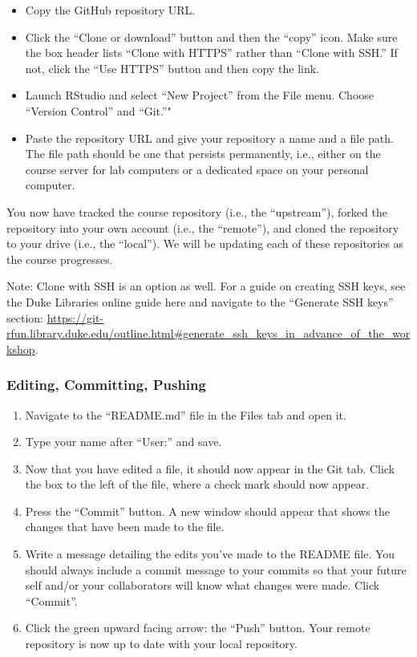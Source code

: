 \documentclass[]{article}
\begin{document}
\begin{itemize}
\item
  Copy the GitHub repository URL.
\item
  Click the ``Clone or download'' button and then the ``copy'' icon.
  Make sure the box header lists ``Clone with HTTPS'' rather than
  ``Clone with SSH.'' If not, click the ``Use HTTPS'' button and then
  copy the link.
\item
  Launch RStudio and select ``New Project'' from the File menu. Choose
  ``Version Control'' and ``Git.''"
\item
  Paste the repository URL and give your repository a name and a file
  path. The file path should be one that persists permanently, i.e.,
  either on the course server for lab computers or a dedicated space on
  your personal computer.
\end{itemize}

You now have tracked the course repository (i.e., the ``upstream''),
forked the repository into your own account (i.e., the ``remote''), and
cloned the repository to your drive (i.e., the ``local''). We will be
updating each of these repositories as the course progresses.

Note: Clone with SSH is an option as well. For a guide on creating SSH
keys, see the Duke Libraries online guide here and navigate to the
``Generate SSH keys'' section:
\url{https://git-rfun.library.duke.edu/outline.html\#generate_ssh_keys_in_advance_of_the_workshop}.

\subsubsection{Editing, Committing,
Pushing}\label{editing-committing-pushing}

\begin{enumerate}
\def\labelenumi{\arabic{enumi}.}
\item
  Navigate to the ``README.md'' file in the Files tab and open it.
\item
  Type your name after ``User:'' and save.
\item
  Now that you have edited a file, it should now appear in the Git tab.
  Click the box to the left of the file, where a check mark should now
  appear.
\item
  Press the ``Commit'' button. A new window should appear that shows the
  changes that have been made to the file.
\item
  Write a message detailing the edits you've made to the README file.
  You should always include a commit message to your commits so that
  your future self and/or your collaborators will know what changes were
  made. Click ``Commit''.
\item
  Click the green upward facing arrow: the ``Push'' button. Your remote
  repository is now up to date with your local repository.
\end{enumerate}
\end{document}
